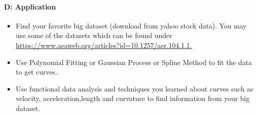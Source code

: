 \documentclass[12pt]{article}
\begin{document}

\paragraph{D: Application}
\begin{itemize}
\item{Find your favorite big dataset (download from yahoo stock data). You may use some of the datasets which can be found under \url{https://www.aeaweb.org/articles?id=10.1257/aer.104.1.1.}}
\item{Use Polynomial Fitting or Gaussian Process or Spline Method to fit the data to get curves.}
\item {Use functional data analysis and techniques you learned about curves such as velocity, acceleration,length and curvature to find information from your big dataset.}

\end{itemize}
\end{document}
